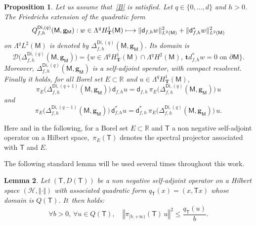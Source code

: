 \documentclass[10pt]{amsart}
\newcommand\mto{\mathchoice{\longmapsto}{\mapsto}{\mapsto}{\mapsto}}
\newcommand{\mc}[1]{\mathcal{#1}}
\newcommand{\mbf}[1]{\mathbf{#1}}
\theoremstyle{plain}
\newtheorem{proposition}{Proposition}
\newtheorem{lemma}[proposition]{Lemma}
\theoremstyle{definition}
\begin{document}
\begin{proposition}\label{pr.defDfhD}
Let us assume that~\ref{B} is satisfied. Let $q\in \{0,\ldots,d\}$ and $h>0$. The Friedrichs extension of the quadratic form
\[
Q_{f,h}^{\mathsf{Di},(q)}(\mathsf M,\mbf g_{\mathsf M}): w\in \Lambda^qH^1_{\mbf T}(\mathsf M)\mto \Vert \mathsf d_{f,h}w \Vert_{L^2(\mathsf M)}^2 + \Vert\mathsf d_{f,h}^*w \Vert_{L^2(\mathsf M)}^2
\]
on $\Lambda^qL^2(\mathsf M)$
is denoted by $\Delta_{f,h}^{\mathsf{Di},(q)}(\mathsf M,\mbf g_{\mathsf M})$. Its domain is
\[
\mathcal D \bigl(\Delta_{f,h}^{\mathsf{Di},(q)}(\mathsf M,\mbf g_{\mathsf M})\bigr)=\big\{ w\in \Lambda^qH^1_{\mbf T}(\mathsf M)\cap\Lambda^qH^2(\mathsf M), \ \mbf
td^*_{f,h} w=0 \text{ on } \partial \mathsf M \big\}.
\]
Moreover, $\Delta^{\mathsf{Di},(q)}_{f,h}(\mathsf M,\mbf g_{\mathsf
M})$ is a self-adjoint operator, with compact resolvent. Finally it holds, for all Borel set $E\subset \mathbb R$ and $u\in \Lambda^qH^1_{\mbf T}(\mathsf M)$,
\begin{equation}\label{eq.complexeMM1}
\pi_{E}\bigl(\Delta_{f,h}^{\mathsf{Di},(q+1)}(\mathsf M,\mbf g_{\mathsf M})\bigr)\, \mathsf d_{f,h}u=\mathsf d_{f,h}\, \pi_{E}\bigl(\Delta_{f,h}^{\mathsf{Di},(q)}(\mathsf M,\mbf g_{\mathsf M})\bigr) \, u
\end{equation}
and
\begin{equation}\label{eq.complexeMM2}
\pi_{E}\bigl(\Delta_{f,h}^{\mathsf{Di},(q-1)}(\mathsf M,\mbf g_{\mathsf M})\bigr)\, \mathsf d_{f,h}^*u=\mathsf d_{f,h}^*\, \pi_{E}\bigl(\Delta_{f,h}^{\mathsf{Di},(q)}(\mathsf M,\mbf g_{\mathsf M}) \bigr)\, u.
\end{equation}
\end{proposition}

Here and in the following, for a Borel set $E\subset \mathbb R$ and
$\mathsf T$ a non negative self-adjoint operator on a Hilbert
space,~$\pi_{E}(\mathsf T)$ denotes the spectral projector associated
with $\mathsf T$ and $E$.

The following standard lemma will be used several times throughout this work.
\begin{lemma} \label{quadra}
Let $(\mathsf T,D\left (\mathsf T\right))$ be a non negative self-adjoint operator on a Hilbert space $\left(\mc H, \Vert\cdot\Vert\right)$ with associated quadratic form $q_{\mathsf T}(x)=(x,\mathsf Tx)$ whose domain is $Q\left (\mathsf T\right)$. It~then holds:
\[
\forall b>0, \, \forall u\in Q (\mathsf T), \quad \left\Vert \pi_{[b,+\infty)} (\mathsf T) \, u\right\Vert^2 \leq \frac{q_{\mathsf T}(u)}{b}.
\]
\end{lemma}
\end{document}
